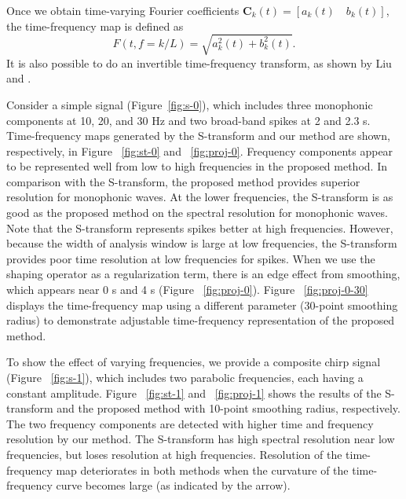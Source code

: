 Once we obtain time-varying Fourier coefficients $\mathbf{C}_{k}(t)=\left[a_{k}(t) \quad b_{k}(t)\right]$, the time-frequency map is defined as
      \begin{equation}
          F(t,f=k/L)=\sqrt{a_{k}^{2}(t)+b_{k}^{2}(t)}.
        \label{eq:eq11}
      \end{equation}
It is also possible to do an invertible time-frequency transform, as
shown by Liu and \cite {Liu2010}.


Consider a simple signal (Figure~\ref{fig:s-0}), which includes three monophonic
components at 10, 20, and 30 Hz and two broad-band spikes
at 2 and 2.3 s. Time-frequency maps generated by the S-transform
and our method are shown, respectively, in Figure ~\ref{fig:st-0} and ~\ref{fig:proj-0}.
Frequency components appear to be represented well from low
to high frequencies in the proposed method. In comparison with
the S-transform, the proposed method provides superior resolution
for monophonic waves. At the lower frequencies, the S-transform
is as good as the proposed method on the spectral resolution for
monophonic waves. Note that the S-transform represents spikes better
at high frequencies. However, because the width of analysis window
is large at low frequencies, the S-transform provides poor time
resolution at low frequencies for spikes. When we use the shaping
operator as a regularization term, there is an edge effect from
smoothing, which appears near 0 s and 4 s (Figure ~\ref{fig:proj-0}). Figure ~\ref{fig:proj-0-30}
displays the time-frequency map using a different parameter
(30-point smoothing radius) to demonstrate adjustable time-frequency
representation of the proposed method.

  
To show the effect of varying frequencies, we provide a composite
chirp signal (Figure ~\ref{fig:s-1}), which includes two parabolic frequencies,
each having a constant amplitude. Figure ~\ref{fig:st-1} and ~\ref{fig:proj-1} shows the
results of the S-transform and the proposed method with 10-point
smoothing radius, respectively. The two frequency components are
detected with higher time and frequency resolution by our method.
The S-transform has high spectral resolution near low frequencies,
but loses resolution at high frequencies. Resolution of the time-frequency
map deteriorates in both methods when the curvature
of the time-frequency curve becomes large (as indicated by
the arrow).

